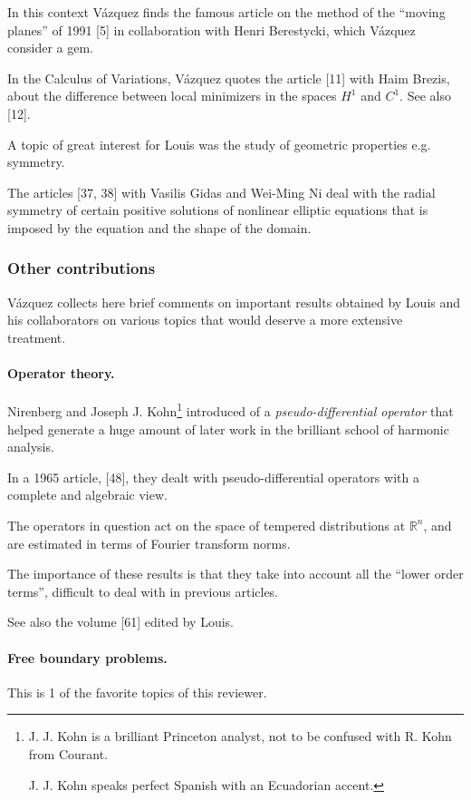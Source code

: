 \documentclass{article}
\begin{document}
In this context V\'azquez finds the famous article on the method of the ``moving planes'' of 1991 [5] in collaboration with Henri Berestycki, which V\'azquez consider a gem.

%
In the Calculus of Variations, V\'azquez quotes the article [11] with Haim Brezis, about the difference between local minimizers in the spaces $H^1$ and $C^1$. See also [12].

%
A topic of great interest for Louis was the study of geometric properties e.g. symmetry.

The articles [37, 38] with Vasilis Gidas and Wei-Ming Ni deal with the radial symmetry of certain positive solutions of nonlinear elliptic equations that is imposed by the equation and the shape of the domain.

\subsubsection{Other contributions}
V\'azquez collects here brief comments on important results obtained by Louis and his collaborators on various topics that would deserve a more extensive treatment.

\paragraph{Operator theory.} Nirenberg and Joseph J. Kohn\footnote{J. J. Kohn is a brilliant Princeton analyst, not to be confused with R. Kohn from Courant.
	
	J. J. Kohn speaks perfect Spanish with an Ecuadorian accent.} introduced of a \textit{pseudo-differential operator} that helped generate a huge amount of later work in the brilliant school of harmonic analysis.

In a 1965 article, [48], they dealt with pseudo-differential operators with a complete and algebraic view.

The operators in question act on the space of tempered distributions at $\mathbb{R}^n$, and are estimated in terms of Fourier transform norms.

The importance of these results is that they take into account all the ``lower order terms'', difficult to deal with in previous articles.

See also the volume [61] edited by Louis.

\paragraph{Free boundary problems.} This is 1 of the favorite topics of this reviewer.
\end{document}

